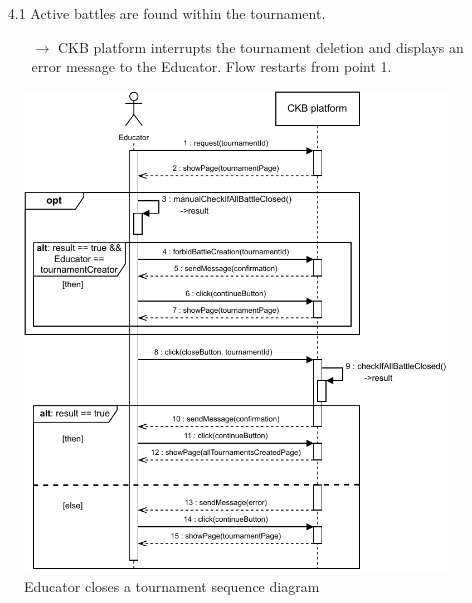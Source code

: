 \documentclass{article}
\begin{document}
{\begin{enumerate}
\begin{xltabular}{\textwidth}
\begin{itemize}
                        \begin{itemize}
                            \item[$\rightarrow$] Educator can prevent 
                                  other Educators from creating new battles if he's the tournament
                                  creator. The flow restarts from point 1.
                        \end{itemize}
                  \item[4.1] Active battles are found within the tournament.
                        \begin{itemize}
                            \item[$\rightarrow$] CKB platform interrupts the tournament
                                  deletion and displays an error message to the Educator. Flow
                                  restarts from point 1.
                        \end{itemize}
              \end{itemize}
          \end{xltabular}

          \begin{figure}[H]
              \centering
              \includegraphics[scale=0.95]{images/SequenceDiagrams/Sequence7.pdf}
              \caption{Educator closes a tournament sequence diagram}
              \label{fig:TournamentClosingSeqDiagram}
          \end{figure}


\end{enumerate}}
\end{document}
